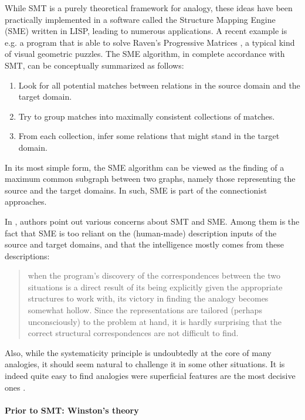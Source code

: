 While SMT is a purely theoretical framework for analogy, these ideas have been
practically implemented in a software called the Structure Mapping Engine (SME)
\cite{FalForKenGen89} written in LISP, leading to numerous applications. A
recent example is e.g. a program that is able to solve Raven's Progressive
Matrices \cite{LovForUsh10}, a typical kind of visual geometric
puzzles. The SME algorithm, in complete accordance with SMT, can be
conceptually summarized as follows:
\begin{enumerate}
    \item Look for all potential matches between relations in the source domain
      and the target domain.
    \item Try to group matches into maximally consistent collections of
      matches.
    \item From each collection, infer some relations that might stand in the
      target domain.
\end{enumerate}
In its most simple form, the SME algorithm can be viewed as the finding of a
maximum common subgraph between two graphs, namely those representing the
source and the target domains. In such, SME is part of the connectionist
approaches.

In  \cite{ChaFreHof92}, authors point out various concerns about SMT and SME.
Among them is the fact that SME is too reliant on the (human-made) description
inputs of the source and target domains, and that the intelligence mostly comes
from these descriptions:

\begin{quote}
  when the program’s discovery of the correspondences between the two situations
  is a direct result of its being explicitly given the appropriate structures
  to work with, its victory in finding the analogy becomes somewhat hollow.
  Since the representations are tailored (perhaps unconsciously) to the problem
  at hand, it is hardly surprising that the correct structural correspondences
  are not difficult to find.
\end{quote}

Also, while the systematicity principle is undoubtedly at the core of many
analogies, it should seem natural to challenge it in some other situations. It
is indeed quite easy to find analogies were superficial features are the most
decisive ones \cite{Bar10}.

\paragraph{Prior to SMT: Winston's theory\\}

